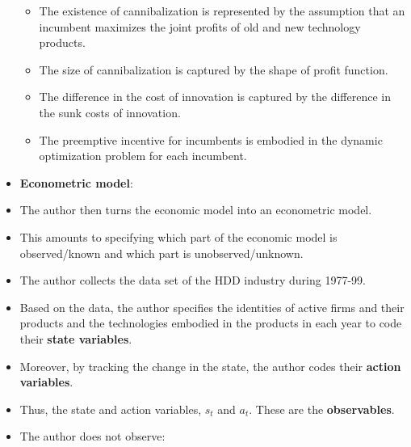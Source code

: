 \documentclass[
]{book}
\providecommand{\tightlist}{%
  \setlength{\itemsep}{0pt}\setlength{\parskip}{0pt}}
\begin{document}
\begin{itemize}
  \begin{itemize}
  \tightlist
  \item
    The existence of cannibalization is represented by the assumption that an incumbent maximizes the joint profits of old and new technology products.
  \item
    The size of cannibalization is captured by the shape of profit function.
  \item
    The difference in the cost of innovation is captured by the difference in the sunk costs of innovation.
  \item
    The preemptive incentive for incumbents is embodied in the dynamic optimization problem for each incumbent.
  \end{itemize}
\item
  \textbf{Econometric model}:
\item
  The author then turns the economic model into an econometric model.
\item
  This amounts to specifying which part of the economic model is observed/known and which part is unobserved/unknown.
\item
  The author collects the data set of the HDD industry during 1977-99.
\item
  Based on the data, the author specifies the identities of active firms and their products and the technologies embodied in the products in each year to code their \textbf{state variables}.
\item
  Moreover, by tracking the change in the state, the author codes their \textbf{action variables}.
\item
  Thus, the state and action variables, \(s_t\) and \(a_t\). These are the \textbf{observables}.
\item
  The author does not observe:


\end{itemize}
\end{document}
